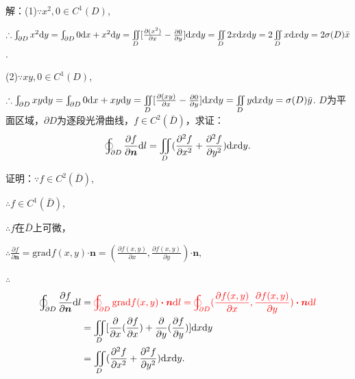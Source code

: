 \documentclass[12pt,UTF8]{ctexart}
\newcommand{\varIInt}[4]{\iint\limits_{#1}#2\mathrm d#3\mathrm d#4}
\newcommand{\LOInt}[3]{\varoint\nolimits_{#1}#2\mathrm d#3}
\newcommand{\BLInt}[2]{\varint\nolimits_{#1}#2}
\newcommand{\md}[1]{\mathrm d#1}
\begin{document}
\begin{enumerate}
解：(1)$\because x^2,0\in C^1(D)$,

$\therefore\BLInt{\partial D}{x^2\md y}=\BLInt{\partial D}{0\md x+x^2\md y}=\varIInt D{[\frac{\partial(x^2)}{\partial x}-\frac{\partial0}{\partial y}]}xy=\varIInt D{2x}xy=2\varIInt Dxxy=2\sigma(D)\bar{x}$.

(2)$\because xy,0\in C^1(D)$,

$\therefore\BLInt{\partial D}{xy\md y}=\BLInt{\partial D}{0\md x+xy\md y}=\varIInt D{[\frac{\partial(xy)}{\partial x}-\frac{\partial 0}{\partial y}]}xy=\varIInt Dyxy=\sigma(D)\bar{y}$.
$D$为平面区域，$\partial D$为逐段光滑曲线，$f\in C^2(\bar{D})$，求证：
\[
\LOInt{\partial D}{\frac{\partial f}{\partial\bm n}}l=\varIInt D{(\frac{\partial^2f}{\partial x^2}+\frac{\partial^2f}{\partial y^2})}xy.
\]

证明：$\because f\in C^2(\bar{D})$,

$\therefore f\in C^1(\bar{D})$,

$\therefore f$在$\bar{D}$上可微，

$\therefore\frac{\partial f}{\partial\bm n}=\text{grad}f(x,y)\bm\cdot\bm n=(\frac{\partial f(x,y)}{\partial x},\frac{\partial f(x,y)}{\partial y})\bm\cdot\bm n$,

$\therefore$
\[\begin{split}
\LOInt{\partial D}{\frac{\partial f}{\partial\bm n}}l&=\color{red}\LOInt{\partial D}{\text{grad}f(x,y)\bm\cdot\bm n}{l}=\LOInt{\partial D}{(\frac{\partial f(x,y)}{\partial x},\frac{\partial f(x,y)}{\partial y})\bm\cdot\bm n}{l}\\
&=\varIInt{D}{[\frac\partial{\partial x}(\frac{\partial f}{\partial x})+\frac\partial{\partial y}(\frac{\partial f}{\partial y})]}{x}{y}\\
&=\varIInt D{(\frac{\partial^2f}{\partial x^2}+\frac{\partial^2f}{\partial y^2})}xy.
\end{split}\]
\end{enumerate}
\end{document}
